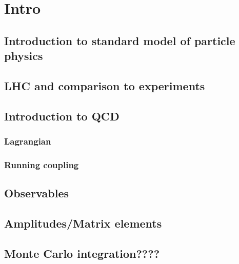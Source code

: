 \documentclass[main.tex]{subfiles}
\begin{document}
\chapter{Intro}
\label{chapter:intro}
\section{Introduction to standard model of particle physics}
\section{LHC and comparison to experiments}
\section{Introduction to QCD}
\subsection{Lagrangian}
\subsection{Running coupling}
\section{Observables}
\section{Amplitudes/Matrix elements}
\section{Monte Carlo integration????}
\end{document}
